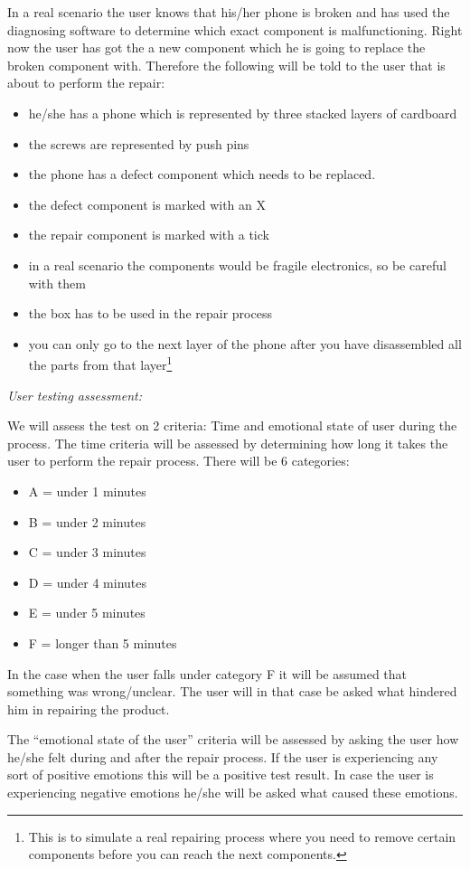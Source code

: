 \documentclass[final,a4paper]{report} %
\begin{document}
	In a real scenario the user knows that his/her phone is broken and has used the diagnosing software to determine which exact component is malfunctioning. Right now the user has got the a new component which he is going to replace the broken component with.  
	Therefore the following will be told to the user that is about to perform the repair:
	\begin{itemize}
		\item he/she has a phone which is represented by three stacked layers of cardboard
		\item the screws are represented by push pins 
		\item the phone has a defect component which needs to be replaced.
		\item the defect component is marked with an X 
		\item the repair component is marked with a tick 
		\item in a real scenario the components would be fragile electronics, so be careful with them
		\item the box has to be used in the repair process
		\item you can only go to the next layer of the phone after you have disassembled all the parts from that layer\footnote{This is to simulate a real repairing process where you need to remove certain components before you can reach the next components.}
	\end{itemize}
	
	
	\textit{User testing assessment:} 
	
	We will assess the test on 2 criteria: Time and emotional state of user during the process.
	The time criteria will be assessed by determining how long it takes the user to perform the repair process. There will be 6 categories:
	\begin{itemize} 
		\item A = under 1 minutes 
		\item B = under 2 minutes
		\item C = under 3 minutes
		\item D = under 4 minutes
		\item E = under 5 minutes
		\item F = longer than 5 minutes
	\end{itemize} 
	In the case when the user falls under category F it will be assumed that something was wrong/unclear. The user will in that case be asked what hindered him in repairing the product.
	
	The ``emotional state of the user'' criteria will be assessed by asking the user how he/she felt during and after the repair process. If the user is experiencing any sort of positive emotions this will be a positive test result. In case the user is experiencing negative emotions he/she will be asked what caused these emotions. 
	
\end{document}
